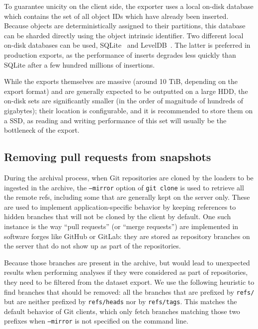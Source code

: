 To guarantee unicity on the client side, the exporter uses a local on-disk
database which contains the set of all object IDs which have already been
inserted. Because objects are deterministically assigned to their partitions,
this database can be sharded directly using the object intrinsic identifier.
Two different local on-disk databases can be used,
SQLite~\cite{owens2006sqlitebook} and LevelDB~\cite{ghemawat2011leveldb}. The
latter is preferred in production exports, as the performance of inserts
degrades less quickly than SQLite after a few hundred millions of insertions.

While the exports themselves are massive (around 10 TiB, depending on the
export format) and are generally expected to be outputted on a large \gls{HDD},
the on-disk sets are significantly smaller (in the order of magnitude of
hundreds of gigabytes); their location is configurable, and it is recommended
to store them on a \gls{SSD}, as reading and writing performance of this set
will usually be the bottleneck of the export.

\subsection{Removing pull requests from snapshots}

During the archival process, when Git repositories are cloned by the loaders to
be ingested in the archive, the \texttt{--mirror} option of \texttt{git clone}
is used to retrieve all the remote refs, including some that are generally kept
on the server only. These are used to implement application-specific behavior
by keeping references to hidden branches that will not be cloned by the client
by default. One such instance is the way ``pull requests'' (or ``merge
requests'') are implemented in software forges like GitHub or GitLab: they are
stored as repository branches on the server that do not show up as part of the
repositories.

Because those branches are present in the archive, but would lead to unexpected
results when performing analyses if they were considered as part of
repositories, they need to be filtered from the dataset export. We use the
following heuristic to find branches that should be removed: all the branches
that are prefixed by \texttt{refs/} but are neither prefixed by
\texttt{refs/heads} nor by \texttt{refs/tags}. This matches the default
behavior of Git clients, which only fetch branches matching those two prefixes
when \texttt{--mirror} is not specified on the command line.

